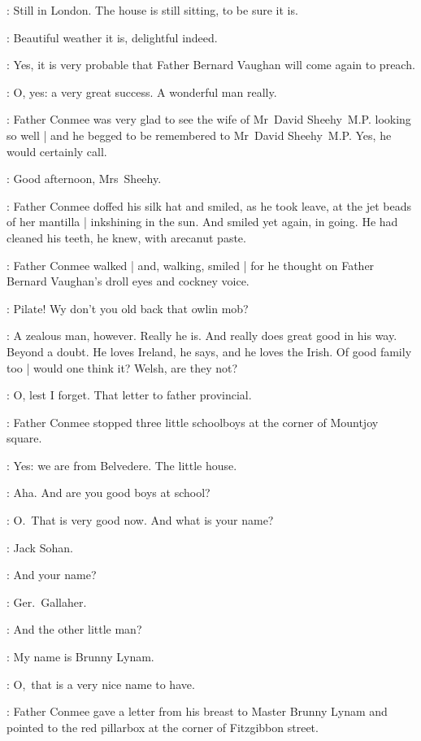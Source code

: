 \mrssheehy:
Still in London.
The house is still sitting, to be sure it is.

\mrssheehy:
Beautiful weather it is, delightful indeed.

\conmee:
Yes, it is very probable that Father Bernard Vaughan will come again to preach.

\conmee:
O, yes: a very great success.
A wonderful man really.

:
Father Conmee was very glad 
to see the wife of Mr~David Sheehy~M.P. looking so well |
and he begged to be remembered to Mr~David Sheehy~M.P\@.
Yes, he would certainly call.

\conmee:
Good afternoon, Mrs~Sheehy.


:
Father Conmee doffed his silk hat and smiled,%
as he took leave,
at the jet beads of her mantilla |
inkshining in the sun.
And smiled yet again, in going.
He had cleaned his teeth, he knew, with arecanut paste.

:
Father Conmee walked |
and, walking, smiled |
for he thought on
Father Bernard Vaughan's droll eyes and cockney voice.

\conmeeint: 
Pilate!
Wy don't you old back that owlin mob?

\conmeeint:
A zealous man, however.
Really he is.
And really does great good in his way.
Beyond a doubt.
He loves Ireland, he says, and he loves the Irish.
Of good family too |
would one think it?
Welsh, are they not?

\conmeeint:
O, lest I forget.
That letter to father provincial.

:
Father Conmee stopped three little schoolboys%
at the corner of Mountjoy square.

\Boys:
Yes: we are from Belvedere.
The little house.

\conmee:
Aha.
And are you good boys at school?

\conmee:
O.~That is very good now.
And what is your name?

:
Jack Sohan.

\conmee:
And your name?

:
Ger.~Gallaher.

\conmee:
And the other little man?

:
My name is Brunny Lynam.

\conmee:
O,~that is a very nice name to have.

:
Father Conmee gave a letter from his breast to Master Brunny Lynam
and pointed to the red pillarbox at the corner of Fitzgibbon street.

